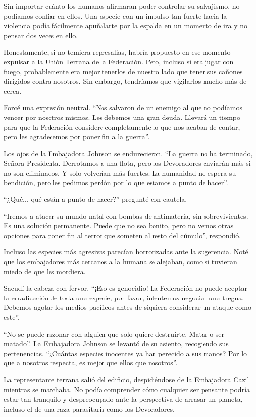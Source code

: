 \documentclass[spanish,12pt,a4paper,oneside,titlepage]{book}
\begin{document}
    Sin importar cuánto los humanos afirmaran poder controlar su salvajismo, no podíamos confiar en ellos. Una especie con un impulso tan fuerte hacia la violencia podía fácilmente apuñalarte por la espalda en un momento de ira y no pensar dos veces en ello.

    Honestamente, si no temiera represalias, habría propuesto en ese momento expulsar a la Unión Terrana de la Federación. Pero, incluso si era jugar con fuego, probablemente era mejor tenerlos de nuestro lado que tener sus cañones dirigidos contra nosotros. Sin embargo, tendríamos que vigilarlos mucho más de cerca.

    Forcé una expresión neutral. ``Nos salvaron de un enemigo al que no podíamos vencer por nosotros mismos. Les debemos una gran deuda. Llevará un tiempo para que la Federación considere completamente lo que nos acaban de contar, pero les agradecemos por poner fin a la guerra''.

    Los ojos de la Embajadora Johnson se endurecieron. ``La guerra no ha terminado, Señora Presidenta. Derrotamos a una flota, pero los Devoradores enviarán más si no son eliminados. Y solo volverían más fuertes. La humanidad no espera su bendición, pero les pedimos perdón por lo que estamos a punto de hacer''.

    ``¿Qué... qué están a punto de hacer?'' pregunté con cautela.

    ``Iremos a atacar su mundo natal con bombas de antimateria, sin sobrevivientes. Es una solución permanente. Puede que no sea bonito, pero no vemos otras opciones para poner fin al terror que someten al resto del cúmulo'', respondió.

    Incluso las especies más agresivas parecían horrorizadas ante la sugerencia. Noté que los embajadores más cercanos a la humana se alejaban, como si tuvieran miedo de que les mordiera.

    Sacudí la cabeza con fervor. ``¡Eso es genocidio! La Federación no puede aceptar la erradicación de toda una especie; por favor, intentemos negociar una tregua. Debemos agotar los medios pacíficos antes de siquiera considerar un ataque como este''.

    ``No se puede razonar con alguien que solo quiere destruirte. Matar o ser matado''. La Embajadora Johnson se levantó de su asiento, recogiendo sus pertenencias. ``¿Cuántas especies inocentes ya han perecido a sus manos? Por lo que a nosotros respecta, es mejor que ellos que nosotros''.

    La representante terrana salió del edificio, despidiéndose de la Embajadora Cazil mientras se marchaba. No podía comprender cómo cualquier ser pensante podría estar tan tranquilo y despreocupado ante la perspectiva de arrasar un planeta, incluso el de una raza parasitaria como los Devoradores.
\end{document}
